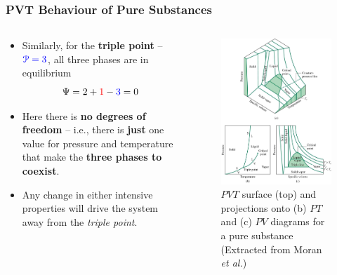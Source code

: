 \documentclass[10pt,compress]{beamer}
\begin{document}
\begin{frame}
 \frametitle{PVT Behaviour of Pure Substances}
 \begin{columns}
  \begin{column}[l]{0.5\linewidth}
\begin{itemize}
\item <1-> Similarly, for the {\bf triple point} -- $\textcolor{blue}{\mathcal{P}=3}$, all three phases are in equilibrium
\begin{displaymath}
\Psi = 2 + \textcolor{red}{1} - \textcolor{blue}{3} = 0
\end{displaymath}
\item <2-> Here there is {\bf no degrees of freedom} -- i.e., there is {\bf just} one value for pressure and temperature that make the {\bf three phases to coexist}.
\item <3-> Any change in either intensive properties will drive the system away from the {\it triple point}.
\end{itemize}
  \end{column}
  \begin{column}[l]{0.5\linewidth}
   \begin{figure}%
    \begin{center}
     \includegraphics[width=4.cm,clip]{./Pics/PVT_Surface.jpg}
    \end{center}
\caption{$PVT$ surface (top) and projections onto (b) $PT$ and (c) $PV$ diagrams for a pure substance (Extracted from Moran {\it et al.})}
   \end{figure}    
  \end{column}
 \end{columns}
\end{frame}

\end{document}
